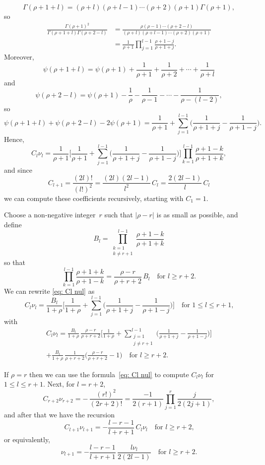 \documentclass[12pt,a4paper]{article}
\begin{document}
\[
\Gamma(\rho+1+l)=(\rho+l)(\rho+l-1)\cdots(\rho+2)(\rho+1)
	\Gamma(\rho+1),
\]
so
\begin{align*}
\frac{\Gamma(\rho+1)^2}{\Gamma(\rho+1+l)\Gamma(\rho+2-l)}
	&=\frac{\rho(\rho-1)\cdots(\rho+2-l)}%
{(\rho+l)(\rho+l-1)\cdots(\rho+2)(\rho+1)}\\
	&=\frac{1}{\rho+1}\prod_{j=1}^{l-1}\frac{\rho+1-j}{\rho+1+j}.
\end{align*}
Moreover,
\[
\psi(\rho+1+l)=\psi(\rho+1)+\frac{1}{\rho+1}+\frac{1}{\rho+2}
	+\cdots+\frac{1}{\rho+l}
\]
and
\[
\psi(\rho+2-l)=\psi(\rho+1)-\frac{1}{\rho}-\frac{1}{\rho-1}
	-\cdots-\frac{1}{\rho-(l-2)},
\]
so
\[
\psi(\rho+1+l)+\psi(\rho+2-l)-2\psi(\rho+1)
	=\frac{1}{\rho+1}+\sum_{j=1}^{l-1}\biggl(\frac{1}{\rho+1+j}
		-\frac{1}{\rho+1-j}\biggr).
\]
Hence,
\begin{equation}\label{eq: Cl nul}
C_l\nu_l=\frac{1}{\rho+1}\biggl[\frac{1}{\rho+1}
	+\sum_{j=1}^{l-1}\biggl(\frac{1}{\rho+1+j}
		-\frac{1}{\rho+1-j}\biggr)\biggr]
	\prod_{k=1}^{l-1}\frac{\rho+1-k}{\rho+1+k},
\end{equation}
and since
\[
C_{l+1}=\frac{(2l)!}{(l!)^2}=\frac{(2l)(2l-1)}{l^2}\,C_l
	=\frac{2(2l-1)}{l}\,C_l
\]
we can compute these coefficients recursively, starting with $C_1=1$.

Choose a non-negative integer~$r$ such that $|\rho-r|$ is as small as 
possible, and define
\[
B_l=\prod_{\substack{k=1\\ k\ne r+1}}^{l-1}\frac{\rho+1-k}{\rho+1+k}
\]
so that
\[
\prod_{k=1}^{l-1}\frac{\rho+1+k}{\rho+1-k}
	=\frac{\rho-r}{\rho+r+2}\,B_l\quad\text{for $l\ge r+2$.}
\]
We can rewrite \eqref{eq: Cl nul} as
\[
C_l\nu_l=\frac{B_l}{1+\rho}\biggl[\frac{1}{1+\rho}+\sum_{j=1}^{l-1}
	\biggl(\frac{1}{\rho+1+j}-\frac{1}{\rho+1-j}\biggr)
		\biggr]\quad\text{for $1\le l\le r+1$,}
\]
with
\begin{multline*}
C_l\nu_l=\frac{B_l}{1+\rho}\,\frac{\rho-r}{\rho+r+2}\biggl[
	\frac{1}{1+\rho}+\sum_{\substack{j=1\\ j\ne r+1}}^{l-1}\biggl(
	\frac{1}{\rho+1+j}-\frac{1}{\rho+1-j}\biggr)\biggr]\\
+\frac{B_l}{1+\rho}\,\frac{1}{\rho+r+2}
	\biggl(\frac{\rho-r}{\rho+r+2}-1\biggr)
		\quad\text{for $l\ge r+2$.}
\end{multline*}


If $\rho=r$ then we can use the formula~\eqref{eq: Cl nul} to compute
$C_l\nu_l$ for $1\le l\le r+1$.  Next, for $l=r+2$,
\[
C_{r+2}\nu_{r+2}=-\,\frac{(r!)^2}{(2r+2)!}=\frac{-1}{2(r+1)}
	\prod_{j=1}^r\frac{j}{2(2j+1)},
\]
and after that we have the recursion
\[
C_{l+1}\nu_{l+1}=-\frac{l-r-1}{l+r+1}\,C_l\nu_l
	\quad\text{for $l\ge r+2$,}
\]
or equivalently,
\[
\nu_{l+1}=-\frac{l-r-1}{l+r+1}\,\frac{l\nu_l}{2(2l-1)}
	\quad\text{for $l\ge r+2$.}
\]





\end{document}
